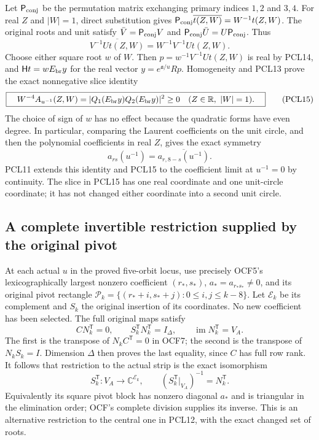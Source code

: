 \documentclass[11pt,a4paper]{article}
\begin{document}
Let $\mathsf P_{\rm conj}$ be the permutation matrix exchanging
primary indices $1,2$ and $3,4$. For real $Z$ and $|W|=1$, direct substitution
gives $\mathsf P_{\rm conj}\overline{t(Z,W)}=W^{-1}t(Z,W)$.
The original roots and unit satisfy
$\bar V=\mathsf P_{\rm conj}V$ and
$\mathsf P_{\rm conj}\bar U=U\mathsf P_{\rm conj}$. Thus
\[
 \overline{V^{-1}Ut(Z,W)}=W^{-1}V^{-1}Ut(Z,W).
 \tag{PCL14}
\]
Choose either square root $w$ of $W$. Then
$p=w^{-1}V^{-1}Ut(Z,W)$ is real by PCL14, and
$\mathsf Ht=wE_{\rm br}y$ for the real vector
$y=e^{\mathfrak a/u}Rp$. Homogeneity and PCL13 prove the exact
nonnegative slice identity
\[
 \boxed{\quad
 W^{-4}A_{u^{-1}}(Z,W)
   =|Q_1(E_{\rm br}y)Q_2(E_{\rm br}y)|^2\ge0
       \quad(Z\in\mathbb R,\ |W|=1).\quad}
 \tag{PCL15}
\]
The choice of sign of $w$ has no effect because the quadratic
forms have even degree. In particular, comparing the Laurent
coefficients on the unit circle, and then the polynomial
coefficients in real $Z$, gives the exact symmetry
\[
             a_{rs}(u^{-1})=\overline{a_{r,8-s}(u^{-1})}.
 \tag{PCL16}
\]
PCL11 extends this identity and PCL15 to the coefficient limit
at $u^{-1}=0$ by continuity. The slice in PCL15 has one real
coordinate and one unit-circle coordinate; it has not changed
either coordinate into a second unit circle.

\subsection{A complete invertible restriction supplied by the original pivot}
At each actual $u$ in the proved five-orbit locus, use precisely
OCF5's lexicographically largest nonzero coefficient $(r_*,s_*)$,
$a_*=a_{r_*s_*}\ne0$, and its original pivot rectangle
$\mathcal P_k=\{(r_*+i,s_*+j):0\le i,j\le k-8\}$.
Let $\mathcal E_k$ be its complement and $S_k$ the original
insertion of its coordinates. No new coefficient has been selected.
The full original maps satisfy
\[
 C N_k^{\mathsf T}=0,\qquad
 S_k^{\mathsf T}N_k^{\mathsf T}=I_\Delta,\qquad
 \operatorname{im}N_k^{\mathsf T}=V_A.
 \tag{PCL17}
\]
The first is the transpose of $N_kC^{\mathsf T}=0$ in OCF7;
the second is the transpose of $N_kS_k=I$. Dimension $\Delta$
then proves the last equality, since $C$ has full row rank.
It follows that restriction to the actual strip is the exact
isomorphism
\[
 S_k^{\mathsf T}:V_A\longrightarrow\mathbb C^{\mathcal E_k},
        \qquad (S_k^{\mathsf T}|_{V_A})^{-1}=N_k^{\mathsf T}.
 \tag{PCL18}
\]
Equivalently its square pivot block has nonzero diagonal $a_*$
and is triangular in the elimination order; OCF's complete
division supplies its inverse. This is an alternative restriction
to the central one in PCL12, with the exact changed set of roots.
\end{document}
